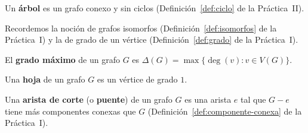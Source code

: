 \begin{definition}
    Un \textbf{árbol} es un grafo conexo y sin ciclos (Definición~\ref{def:ciclo} de la Práctica~II).
\end{definition}

Recordemos la noción de grafos isomorfos (Definición~\ref{def:isomorfos} de la Práctica~I) y la de grado de un vértice (Definición~\ref{def:grado} de la Práctica~I).

\begin{definition}
    El \textbf{grado máximo} de un grafo \( G \) es \( \Delta(G) = \max \{ \deg(v) : v \in V(G) \} \).
\end{definition}

\begin{definition}
    Una \textbf{hoja} de un grafo \( G \) es un vértice de grado \( 1 \).
\end{definition}

\begin{definition}
    Una \textbf{arista de corte} (o \textbf{puente}) de un grafo \( G \) es una arista \( e \) tal que \( G - e \) tiene más componentes conexas que \( G \) (Definición~\ref{def:componente-conexa} de la Práctica~I).
\end{definition}

